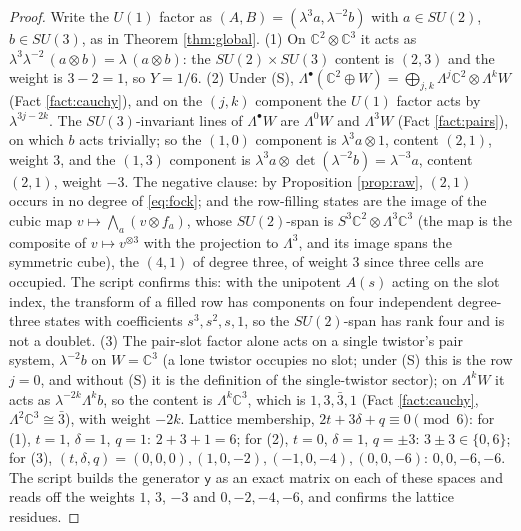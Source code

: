 \documentclass[11pt]{article}
\theoremstyle{definition}
\newcommand{\C}{\mathbb{C}}
\begin{document}
\begin{proof}
Write the $U(1)$ factor as $(A, B) = (\lambda^{3}a, \lambda^{-2}b)$ with $a \in SU(2)$, $b \in SU(3)$, as in Theorem \ref{thm:global}. (1) On $\C^{2} \otimes \C^{3}$ it acts as $\lambda^{3}\lambda^{-2}\,(a \otimes b) = \lambda\,(a \otimes b)$: the $SU(2) \times SU(3)$ content is $(2,3)$ and the weight is $3 - 2 = 1$, so $Y = 1/6$. (2) Under (S), $\Lambda^{\bullet}(\C^{2} \oplus W) = \bigoplus_{j,k}\Lambda^{j}\C^{2} \otimes \Lambda^{k}W$ (Fact \ref{fact:cauchy}), and on the $(j, k)$ component the $U(1)$ factor acts by $\lambda^{3j - 2k}$. The $SU(3)$-invariant lines of $\Lambda^{\bullet}W$ are $\Lambda^{0}W$ and $\Lambda^{3}W$ (Fact \ref{fact:pairs}), on which $b$ acts trivially; so the $(1, 0)$ component is $\lambda^{3}a \otimes 1$, content $(2,1)$, weight $3$, and the $(1, 3)$ component is $\lambda^{3}a \otimes \det(\lambda^{-2}b) = \lambda^{-3}a$, content $(2,1)$, weight $-3$. The negative clause: by Proposition \ref{prop:raw}, $(2,1)$ occurs in no degree of \eqref{eq:fock}; and the row-filling states are the image of the cubic map $v \mapsto \bigwedge_{a}(v \otimes f_{a})$, whose $SU(2)$-span is $S^{3}\C^{2} \otimes \Lambda^{3}\C^{3}$ (the map is the composite of $v \mapsto v^{\otimes 3}$ with the projection to $\Lambda^{3}$, and its image spans the symmetric cube), the $(4,1)$ of degree three, of weight $3$ since three cells are occupied. The script confirms this: with the unipotent $A(s)$ acting on the slot index, the transform of a filled row has components on four independent degree-three states with coefficients $s^{3}, s^{2}, s, 1$, so the $SU(2)$-span has rank four and is not a doublet. (3) The pair-slot factor alone acts on a single twistor's pair system, $\lambda^{-2}b$ on $W = \C^{3}$ (a lone twistor occupies no slot; under (S) this is the row $j = 0$, and without (S) it is the definition of the single-twistor sector); on $\Lambda^{k}W$ it acts as $\lambda^{-2k}\Lambda^{k}b$, so the content is $\Lambda^{k}\C^{3}$, which is $1, 3, \bar{3}, 1$ (Fact \ref{fact:cauchy}, $\Lambda^{2}\C^{3} \cong \bar{3}$), with weight $-2k$. Lattice membership, $2t + 3\delta + q \equiv 0 \pmod 6$: for (1), $t = 1$, $\delta = 1$, $q = 1$: $2 + 3 + 1 = 6$; for (2), $t = 0$, $\delta = 1$, $q = \pm 3$: $3 \pm 3 \in \{0, 6\}$; for (3), $(t, \delta, q) = (0, 0, 0), (1, 0, -2), (-1, 0, -4), (0, 0, -6)$: $0, 0, -6, -6$. The script builds the generator $\mathsf{y}$ as an exact matrix on each of these spaces and reads off the weights $1$, $3$, $-3$ and $0, -2, -4, -6$, and confirms the lattice residues.
\end{proof}
\end{document}
